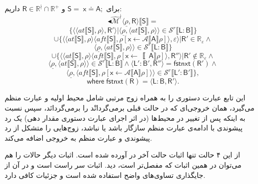 برای $\mathsf{S=\;x \doteq A;}$ و $\mathsf{R} \in \mathbb{R^\nmid} \cap \mathbb{R^+}$ داریم:
$$\blacktriangleleft\mathcal{\hat{M}^\nmid} \langle \underline{\rho}, \mathsf{R} \rangle \llbracket \mathsf{S} \rrbracket
=$$
$$\{
\langle \langle at \llbracket \mathsf{S} \rrbracket, \rho \rangle , \mathsf{R'} \rangle |
\langle \underline{\rho}, \langle at \llbracket \mathsf{S} \rrbracket, \rho \rangle \rangle \in \mathcal{S}^r \llbracket \mathsf{L:B} \rrbracket \}$$
$$\cup \{ \langle \langle at \llbracket \mathsf{S} \rrbracket , \rho \rangle  \langle aft \llbracket \mathsf{S} \rrbracket, 
\rho [\mathsf{x}\leftarrow \mathcal{A}\llbracket \mathsf{A} \rrbracket \rho ]\rangle , \varepsilon \rangle | \mathsf{R'} \in \mathbb{R_\varepsilon} \land$$
$$
\langle \underline{\rho}, \langle at \llbracket \mathsf{S} \rrbracket , \rho \rangle \rangle \in 
\mathcal{S}^r \llbracket \mathsf{L:B} \rrbracket
\}$$
$$\cup \{
\langle \langle at \llbracket \mathsf{S} \rrbracket , \rho \rangle \langle aft \llbracket \mathsf{S} \rrbracket , \rho [\mathsf{x} \leftarrow \mathcal \llbracket \mathsf{A}\rrbracket \rho]\rangle, \mathsf{R''}\rangle | \mathsf{R'} \notin \mathbb{R_\varepsilon} \land$$
$$\langle \underline{\rho},\langle at \llbracket \mathsf{S} \rrbracket , \rho \rangle \rangle \in \mathcal{S}^r \llbracket \mathsf{L:B} \rrbracket \land \langle \mathsf{L':B',R''} \rangle = 
\mathsf{fstnxt(R') }\land$$
$$\langle \underline{\rho}, \langle aft \llbracket \mathsf{S} \rrbracket,\rho 
[\mathsf{x} \leftarrow \mathcal{A}\llbracket \mathsf{A} \rrbracket \rho]\rangle \rangle \in 
\mathcal{S}^r \llbracket \mathsf{L':B'} \rrbracket
\},$$
$$\mathsf{where \; fstnxt(R)=\langle L:B,R' \rangle}.$$

این تابع عبارت‌ دستوری را به همراه زوج مرتبی شامل محیط اولیه و عبارت منظم می‌گیرد، همان خروجی‌ای که در حالت قبلی برمی‌گردانْد را برمی‌گردانَد، سپس نسبت به اینکه پس از تغییر در محیط‌ها (در اثر اجرای عبارت‌ دستوری مقدار دهی) یک رد پیشوندی با ادامه‌ی عبارت منظم سازگار باشد یا نباشد، زوج‌هایی را متشکل از رد پیشوندی و عبارت منظم به خروجی اضافه می‌کند.

از این ۴ حالت تنها اثبات حالت آخر در \cite{calcul} آورده شده است. اثبات دیگر حالات را هم می‌توان در همین اثبات که مفصل‌تر است، دید. اثبات سر راست است و در آن از جایگذاری تساوی‌های واضح استفاده شده است و جزئیات کافی دارد.

